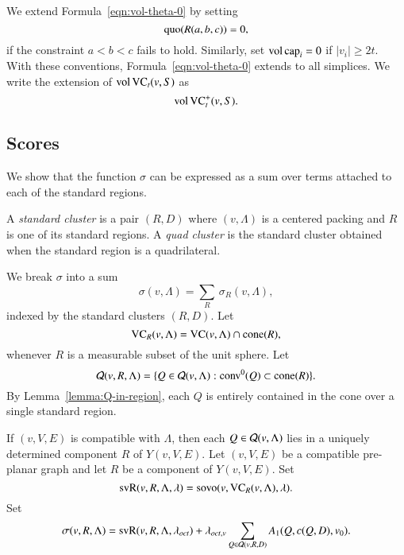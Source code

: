 We extend Formula~\ref{eqn:vol-theta-0} by setting
    $$\operatorname{quo}(R(a,b,c)) = 0,$$
if the constraint $a < b < c$ fails to hold.  Similarly, set
${\operatorname{vol}}\,{\operatorname{cap}}_i=0$ if $|v_i|\ge 2t$.  With these
conventions,  Formula~\ref{eqn:vol-theta-0} extends to all
simplices.  We write the extension of ${\operatorname{vol}}\,{\operatorname{VC}}_t(v,S)$
as
$${\operatorname{vol}}\,{{\operatorname{VC}}^+_t}(v,S).$$


\subsection{Scores}

We show that the function $\sigma$ can be expressed as a sum over
terms attached to each of the standard regions.

\begin{definition} 
A {\it standard cluster\/} is a pair $(R,D)$ where $(v,\Lambda)$ is a
centered packing and $R$ is one of its standard regions.  A {\it
quad cluster\/} is the standard cluster obtained when the standard
region is a quadrilateral.
\end{definition}
%


We break $\sigma$ into a sum
   \begin{equation}
   \sigma(v,\Lambda) = \sum_R\,\sigma_R(v,\Lambda),
   \end{equation}
indexed by the standard clusters $(R,D)$.  Let
   $$
   {\operatorname{VC}}_R(v,\Lambda) = {\operatorname{VC}}(v,\Lambda)\cap {\operatorname{cone}}(R),
   $$
whenever $R$ is a measurable subset of the unit sphere.  Let
   $$
   {\mathcal Q}(v,R,\Lambda) = \{Q\in {\mathcal Q}(v,\Lambda) : {\operatorname{conv}}^0(Q)\subset {\operatorname{cone}}(R)\}.
   $$
By Lemma~\ref{lemma:Q-in-region},
 each $Q$ is entirely contained in the cone over a single
standard region.

\begin{definition} 
If $(v,V,E)$ is compatible with $\Lambda$, then each $Q\in{\mathcal Q}(v,\Lambda)$
lies in a uniquely determined component $R$ of $Y(v,V,E)$.
Let $(v,V,E)$ be a compatible pre-planar graph and let $R$ be a
component of $Y(v,V,E)$.  Set
      $$
      {\operatorname{svR}}(v,R,\Lambda,\lambda) =
      {\operatorname{sovo}}(v,{\operatorname{VC}}_R(v,\Lambda),\lambda).
      $$
Set
      $$
      \sigma(v,R,\Lambda) = {\operatorname{svR}}(v,R,\Lambda,\lambda_{oct}) 
      + \lambda_{oct,v}
         \sum_{Q\in{\mathcal Q}(v,R,D)} A_1(Q,c(Q,D),v_0).
      $$
 
\end{definition}

